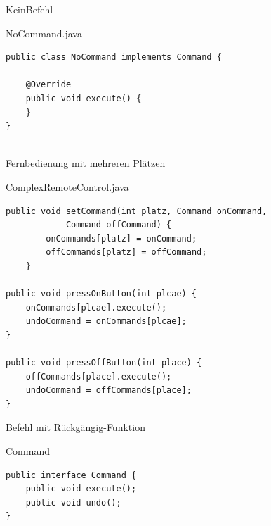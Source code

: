 
\begin{frame}[fragile]{KeinBefehl}
	\begin{exampleblock}{NoCommand.java}
 		\begin{lstlisting}
public class NoCommand implements Command {

	@Override
	public void execute() {
	}
}
    
 		\end{lstlisting}
 	\end{exampleblock}
\end{frame}


\begin{frame}[fragile]{Fernbedienung mit mehreren Plätzen}
	\begin{exampleblock}{ComplexRemoteControl.java}
 		\begin{lstlisting}
public void setCommand(int platz, Command onCommand, 
			Command offCommand) {
		onCommands[platz] = onCommand;
		offCommands[platz] = offCommand;
	}
	
public void pressOnButton(int plcae) {
    onCommands[plcae].execute();
    undoCommand = onCommands[plcae];
}

public void pressOffButton(int place) {
    offCommands[place].execute();
    undoCommand = offCommands[place];
}
 		\end{lstlisting}
 	\end{exampleblock}
\end{frame}


\begin{frame}[fragile]{Befehl mit Rückgängig-Funktion}
	\begin{exampleblock}{Command}
 		\begin{lstlisting}
public interface Command {
	public void execute();
	public void undo();
}
 		\end{lstlisting}
 	\end{exampleblock}
\end{frame}

